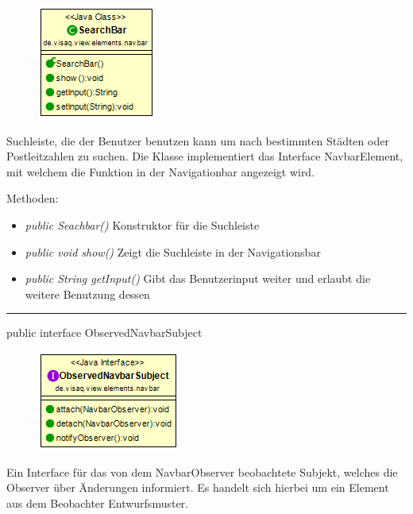 \begin{minipage}{0.3\textwidth}
    \begin{figure}[H]
        \includegraphics[scale = 0.6]{media/frontend/view/de.view.elements.navbar/SearchbarClass.png}
    \end{figure}
    \end{minipage} \hfill
    \begin{minipage}{0.6\textwidth}
Suchleiste, die der Benutzer benutzen kann um nach bestimmten Städten oder Postleitzahlen zu suchen. Die Klasse implementiert das Interface NavbarElement, mit welchem die Funktion in der Navigationbar angezeigt wird.
\end{minipage}

Methoden:
\begin{itemize}
    \item \emph{public Seachbar()} Konstruktor für die Suchleiste
    \item \emph{public void show()} Zeigt die Suchleiste in der Navigationsbar
    \item \emph{public String getInput()} Gibt das Benutzerinput weiter und erlaubt die weitere Benutzung dessen
\end{itemize}

\rule{\textwidth}{0.4pt}
public interface ObservedNavbarSubject

\begin{minipage}{0.3\textwidth}
    \begin{figure}[H]
        \includegraphics[scale = 0.6]{media/frontend/view/de.view.elements.navbar/ObservedNavbarSubjectClass.png}
    \end{figure}
    \end{minipage} \hfill
\begin{minipage}{0.6\textwidth}
Ein Interface für das von dem NavbarObserver beobachtete Subjekt, welches die Observer über Änderungen informiert.  Es handelt sich hierbei um ein Element aus dem Beobachter Entwurfsmuster.
\end{minipage}

